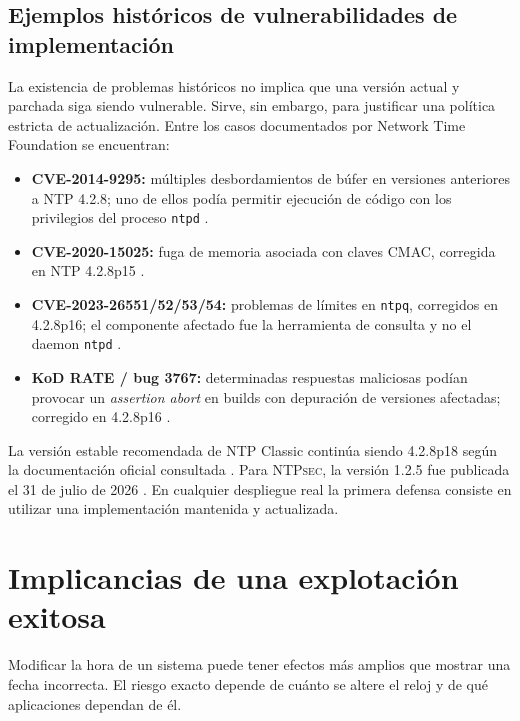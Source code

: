 \documentclass[11pt,a4paper]{article}
\newcommand{\ntpsec}{\textsc{NTPsec}}
\begin{document}
\subsection{Ejemplos históricos de vulnerabilidades de implementación}

La existencia de problemas históricos no implica que una versión actual y parchada siga siendo vulnerable. Sirve, sin embargo, para justificar una política estricta de actualización. Entre los casos documentados por Network Time Foundation se encuentran:

\begin{itemize}
    \item \textbf{CVE-2014-9295:} múltiples desbordamientos de búfer en versiones anteriores a NTP 4.2.8; uno de ellos podía permitir ejecución de código con los privilegios del proceso \texttt{ntpd} \cite{cve20149295}.
    \item \textbf{CVE-2020-15025:} fuga de memoria asociada con claves CMAC, corregida en NTP 4.2.8p15 \cite{cve202015025}.
    \item \textbf{CVE-2023-26551/52/53/54:} problemas de límites en \texttt{ntpq}, corregidos en 4.2.8p16; el componente afectado fue la herramienta de consulta y no el daemon \texttt{ntpd} \cite{cve20232655x}.
    \item \textbf{KoD RATE / bug 3767:} determinadas respuestas maliciosas podían provocar un \emph{assertion abort} en builds con depuración de versiones afectadas; corregido en 4.2.8p16 \cite{bug3767}.
\end{itemize}

La versión estable recomendada de NTP Classic continúa siendo 4.2.8p18 según la documentación oficial consultada \cite{ntpclassic}. Para \ntpsec{}, la versión 1.2.5 fue publicada el 31 de julio de 2026 \cite{ntpsec125}. En cualquier despliegue real la primera defensa consiste en utilizar una implementación mantenida y actualizada.

\section{Implicancias de una explotación exitosa}

Modificar la hora de un sistema puede tener efectos más amplios que mostrar una fecha incorrecta. El riesgo exacto depende de cuánto se altere el reloj y de qué aplicaciones dependan de él.
\end{document}
